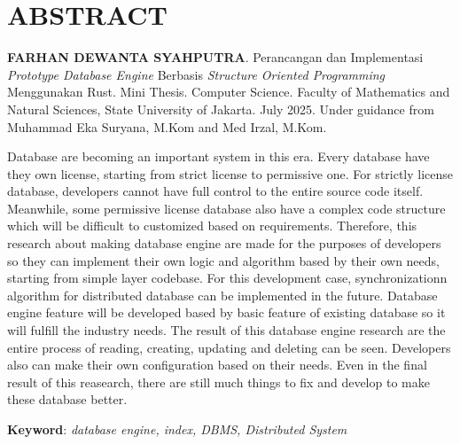 \chapter*{\textbf{ABSTRACT}}

\textbf{FARHAN DEWANTA SYAHPUTRA}. Perancangan dan Implementasi \emph{Prototype Database Engine} Berbasis 
\emph{Structure Oriented Programming} Menggunakan Rust. Mini Thesis. Computer Science. Faculty of Mathematics
and Natural Sciences, State University of Jakarta. July 2025. Under guidance from
Muhammad Eka Suryana, M.Kom and Med Irzal, M.Kom. 


\vspace{5mm}
\noindent{}
Database are becoming an important system in this era. Every database have they own license, starting from strict license 
to permissive one. For strictly license database, developers cannot have full control to the entire source code itself.
Meanwhile, some permissive license database also have a complex code structure which will be difficult to customized based on requirements.
Therefore, this research about making database engine are made for the purposes of developers so they can implement
their own logic and algorithm based by their own needs, starting from simple layer codebase. For this development case, 
synchronizationn algorithm for distributed database can be implemented in the future. Database engine feature will be developed 
based by basic feature of existing database so it will fulfill the industry needs. The result of this database engine research are the entire process of reading, 
creating, updating and deleting can be seen. Developers also can make their own configuration based on their needs. Even in the 
final result of this reasearch, there are still much things to fix and develop to make these database better.

\vspace{5mm}
\noindent{}
\textbf{Keyword}: \emph{database engine, index, DBMS, Distributed System}